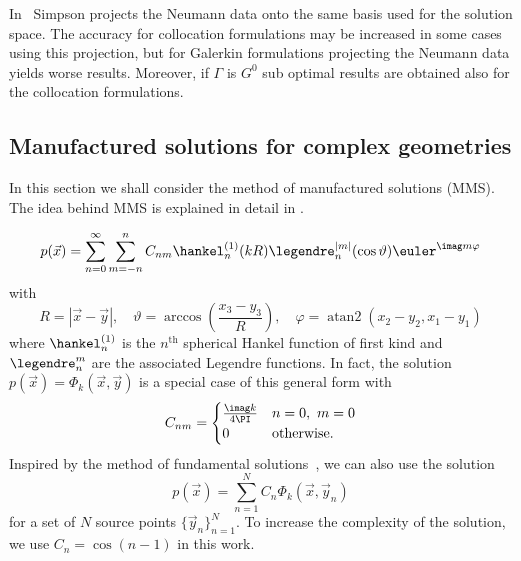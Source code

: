 In~\cite{Simpson2014aib} Simpson projects the Neumann data onto the same basis used for the solution space. The accuracy for collocation formulations may be increased in some cases using this projection, but for Galerkin formulations projecting the Neumann data yields worse results. Moreover, if $\Gamma$ is $G^0$ sub optimal results are obtained also for the collocation formulations.

\subsection{Manufactured solutions for complex geometries}
In this section we shall consider the method of manufactured solutions (MMS). The idea behind MMS is explained in detail in \cite{Roy2005roc}. 

\begin{equation}
	p(\vec{x}) = \sum_{n=0}^\infty\sum_{m=-n}^n C_{nm} \hankel_n^{(1)}(kR) \legendre_n^{|m|}(\cos\vartheta)\euler^{\imag m\varphi} 
\end{equation}
with
\begin{equation*}
	R = |\vec{x}-\vec{y}|,\quad \vartheta=\arccos\left(\frac{x_3-y_3}{R}\right),\quad\varphi = \operatorname{atan2}(x_2-y_2,x_1-y_1)
\end{equation*}
where $\hankel_n^{(1)}$ is the $n^{\mathrm{th}}$ spherical Hankel function of first kind and $\legendre_n^m$ are the associated Legendre functions. In fact, the solution $p(\vec{x}) = \Phi_k(\vec{x},\vec{y})$ is a special case of this general form with 
\begin{equation}
	C_{nm} = \begin{cases}
		\frac{\imag k}{4\PI} & n = 0,\,\,m=0\\
		0 & \text{otherwise}.
		\end{cases}
\end{equation}
Inspired by the method of fundamental solutions~\cite{Fairweather2003tmo}, we can also use the solution
\begin{equation}\label{Eq3:manuMFS}
	p(\vec{x}) = \sum_{n=1}^N C_n \Phi_k(\vec{x},\vec{y}_n)
\end{equation}
for a set of $N$ source points $\{\vec{y}_n\}_{n=1}^N$. To increase the complexity of the solution, we use $C_n=\cos(n-1)$ in this work.

